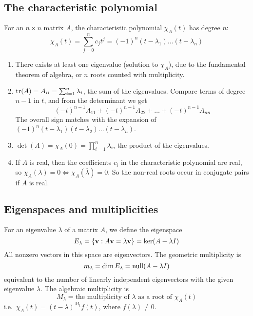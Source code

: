 \subsection{The characteristic polynomial}
For an \(n \times n\) matrix \(A\), the characteristic polynomial \(\chi_A(t)\) has degree \(n\):
\[
	\chi_A(t) = \sum_{j = 0}^n c_j t^j = (-1)^n(t-\lambda_1)\dots(t-\lambda_n)
\]
\begin{enumerate}
	\item There exists at least one eigenvalue (solution to \(\chi_A\)), due to the fundamental theorem of algebra, or \(n\) roots counted with multiplicity.
	\item \(\tr(A) = A_{ii} = \sum_{i=1}^n \lambda_i\), the sum of the eigenvalues.
	      Compare terms of degree \(n-1\) in \(t\), and from the determinant we get
	      \[
		      (-t)^{n-1}A_{11} + (-t)^{n-1}A_{22} + \dots + (-t)^{n-1}A_{nn}
	      \]
	      The overall sign matches with the expansion of \((-1)^n(t-\lambda_1)(t-\lambda_2)\dots(t-\lambda_n)\).
	\item \(\det(A) = \chi_A(0) = \prod_{i=1}^n \lambda_i\), the product of the eigenvalues.
	\item If \(A\) is real, then the coefficients \(c_i\) in the characteristic polynomial are real, so \(\chi_A(\lambda) = 0 \iff \chi_A(\overline\lambda) = 0\).
	      So the non-real roots occur in conjugate pairs if \(A\) is real.
\end{enumerate}

\subsection{Eigenspaces and multiplicities}
For an eigenvalue \(\lambda\) of a matrix \(A\), we define the eigenspace
\[
	E_\lambda = \{ \vb v : A \vb v = \lambda \vb v \} = \ker (A - \lambda I)
\]
All nonzero vectors in this space are eigenvectors.
The geometric multiplicity is
\[
	m_\lambda = \dim E_\lambda = \operatorname{null} (A - \lambda I)
\]
equivalent to the number of linearly independent eigenvectors with the given eigenvalue \(\lambda\).
The algebraic multiplicity is
\[
	M_\lambda = \text{the multiplicity of } \lambda \text{ as a root of } \chi_A(t)
\]
i.e.\ \(\chi_A(t) = (t - \lambda)^{M_t} f(t)\), where \(f(\lambda) \neq 0\).

